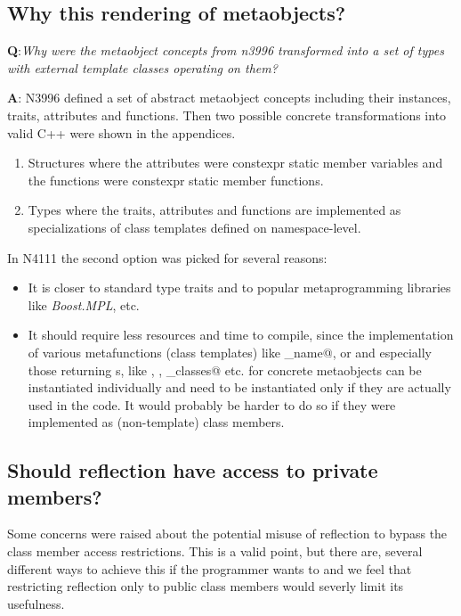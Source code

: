 \subsection{Why this rendering of metaobjects?}

{\textbf Q:}{\em Why were the metaobject concepts from n3996 transformed into a set
of types with external template classes operating on them?
}

{\textbf A:} N3996 defined a set of abstract metaobject concepts including their
instances, traits, attributes and functions.
Then two possible concrete transformations into valid C++ were shown in the appendices.

\begin{enumerate}
\item Structures where the attributes were constexpr static member variables and the functions were
constexpr static member functions.
\item Types where the traits, attributes and functions are implemented as specializations of
class templates defined on namespace-level.
\end{enumerate}

In N4111 the second option was picked for several reasons:

\begin{itemize}
\item It is closer to standard type traits and to popular metaprogramming libraries like {\em Boost.MPL}, etc.
\item It should require less resources and time to compile, since the implementation of various
metafunctions (class templates) like \verb@base_name@, \verb@scope@ or \verb@position@ and
especially those returning s, like \verb@members@, \verb@overloads@,
\verb@base_classes@ etc. for concrete metaobjects can be instantiated individually
and need to be instantiated only if they are actually used in the code. It would probably be harder
to do so if they were implemented as (non-template) class members.
\end{itemize}

\subsection{Should reflection have access to private members?}

Some concerns were raised about the potential misuse of reflection to
bypass the class member access restrictions. This is a valid point, but
there are, several different ways to achieve this if the programmer
wants to and we feel that restricting reflection only to public class members
would severly limit its usefulness.
